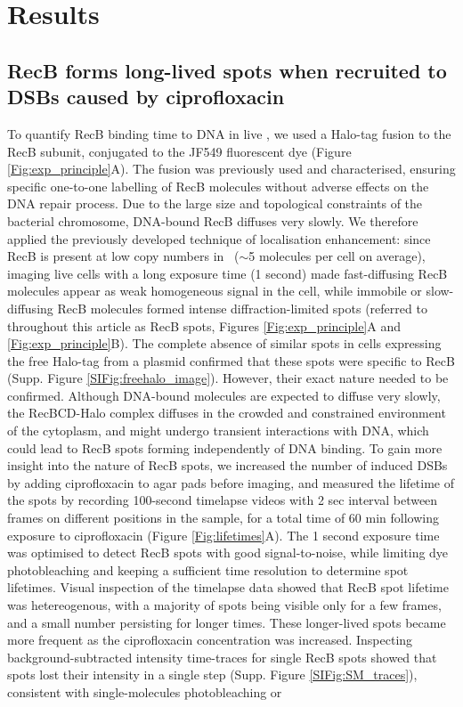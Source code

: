 \section*{Results}

\subsection*{RecB forms long-lived spots when recruited to DSBs caused by cipro\-floxacin}

To quantify RecB binding time to DNA in live \ecoli, we used a Halo-tag fusion to the RecB subunit, conjugated to the JF549 fluorescent dye (Figure \ref{Fig:exp_principle}A). The fusion was previously used and characterised, ensuring specific one-to-one labelling of RecB molecules without adverse effects on the DNA repair process\cite{Lepore2019a,Lepore2023}. Due to the large size and topological constraints of the bacterial chromosome, DNA-bound RecB diffuses very slowly\cite{Lepore2023}. We therefore applied the previously developed technique of localisation enhancement\cite{Yu2006, Elf2007}: since RecB is present at low copy numbers in \ecoli\ ($\sim$5 molecules per cell on average\cite{Lepore2019a}), imaging live cells with a long exposure time (1 second) made fast-diffusing RecB molecules appear as weak homogeneous signal in the cell, while immobile or slow-diffusing RecB molecules formed intense diffraction-limited spots (referred to throughout this article as RecB spots, Figures \ref{Fig:exp_principle}A and \ref{Fig:exp_principle}B). The complete absence of similar spots in cells expressing the free Halo-tag from a plasmid confirmed that these spots were specific to RecB (Supp. Figure \ref{SIFig:freehalo_image}). However, their exact nature needed to be confirmed. Although DNA-bound molecules are expected to diffuse very slowly, the RecBCD-Halo complex diffuses in the crowded and constrained environment of the cytoplasm, and might undergo transient interactions with DNA\cite{Lepore2023}, which could lead to RecB spots forming independently of DNA binding. To gain more insight into the nature of RecB spots, we increased the number of induced DSBs by adding ciprofloxacin to agar pads before imaging, and measured the lifetime of the spots by recording 100-second timelapse videos with 2 sec interval between frames on different positions in the sample, for a total time of 60 min following exposure to ciprofloxacin (Figure \ref{Fig:lifetimes}A). The 1 second exposure time was optimised to detect RecB spots with good signal-to-noise, while limiting dye photobleaching and keeping a sufficient time resolution to determine spot lifetimes. Visual inspection of the timelapse data showed that RecB spot lifetime was hetereogenous, with a majority of spots being visible only for a few frames, and a small number persisting for longer times. These longer-lived spots became more frequent as the ciprofloxacin concentration was increased. Inspecting background-subtracted intensity time-traces for single RecB spots showed that spots lost their intensity in a single step (Supp. Figure \ref{SIFig:SM_traces}), consistent with single-molecules photobleaching or 